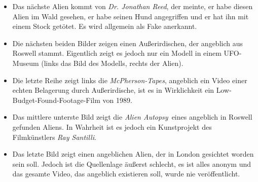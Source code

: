 \documentclass{scrartcl}
\begin{document}
\begin{itemize}
	\item Das nächste Alien kommt von \textit{Dr. Jonathan Reed}, der meinte, er habe diesen Alien im Wald gesehen, er habe seinen Hund angegriffen und er hat ihn mit einem Stock getötet. Es wird allgemein als Fake anerkannt. 
	\item Die nächsten beiden Bilder zeigen einen \frqq Außerirdischen\flqq, der angeblich aus Roswell stammt. Eigentlich zeigt es jedoch nur ein Modell in einem UFO-Museum (links das Bild des Modells, rechts der \frqq Alien\flqq). 
	\item Die letzte Reihe zeigt links die \textit{McPherson-Tapes}, angeblich ein Video einer echten Belagerung durch Außerirdische, ist es in Wirklichkeit ein Low-Budget-Found-Footage-Film von 1989. 
	\item Das mittlere unterste Bild zeigt die \frqq\textit{Alien Autopsy}\flqq\ eines angeblich in Roswell gefunden Aliens. In Wahrheit ist es jedoch ein Kunstprojekt des Filmkünstlers \textit{Ray Santilli}. 
	\item Das letzte Bild zeigt einen angeblichen Alien, der in London gesichtet worden sein soll. Jedoch ist die Quellenlage äußerst schlecht, es ist alles anonym und das gesamte \frqq Video\flqq, das angeblich existieren soll, wurde nie veröffentlicht. 
\end{itemize}
\end{document}
